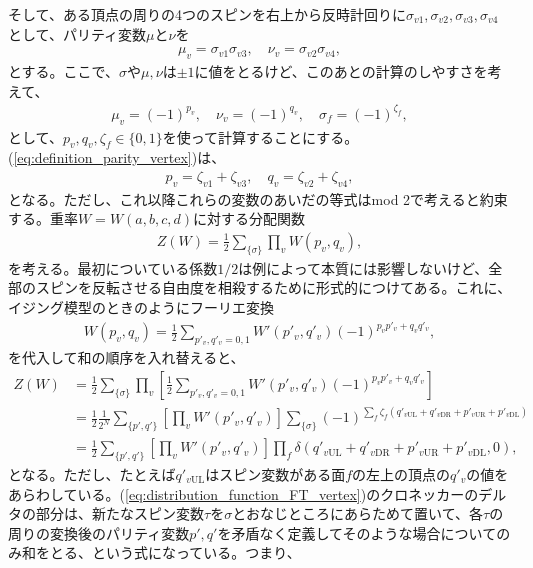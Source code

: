 \documentclass[paper=b5j,fontsize=12Q,jafontsize=12Q,baselineskip=21Q]{jlreq}
\begin{document}
\begin{refsection}
そして、ある頂点の周りの4つのスピンを右上から反時計回りに$\sigma_{v1},\sigma_{v2},\sigma_{v3},\sigma_{v4}$として、パリティ変数$\mu$と$\nu$を
\begin{align}
  \mu_v=\sigma_{v1}\sigma_{v3},\quad\nu_v=\sigma_{v2}\sigma_{v4},\label{eq:definition_parity_vertex}
\end{align}
とする。ここで、$\sigma$や$\mu,\nu$は$\pm1$に値をとるけど、このあとの計算のしやすさを考えて、
\begin{align}
  \mu_v=(-1)^{p_v},\quad \nu_v=(-1)^{q_v},\quad \sigma_f=(-1)^{\zeta_f},
\end{align}
として、$p_v,q_v,\zeta_f\in\{0,1\}$を使って計算することにする。(\ref{eq:definition_parity_vertex})は、
\begin{align}
  p_v=\zeta_{v1}+\zeta_{v3},\quad q_v=\zeta_{v2}+\zeta_{v4},
\end{align}
となる。ただし、これ以降これらの変数のあいだの等式はmod 2で考えると約束する。重率$W=W(a,b,c,d)$に対する分配関数
\begin{align}
  Z(W)=\frac12\sum_{\{\sigma\}}\prod_vW(p_v,q_v),\label{eq:distribution_function_vertex}
\end{align}
を考える。最初についている係数$1/2$は例によって本質には影響しないけど、全部のスピンを反転させる自由度を相殺するために形式的につけてある。これに、イジング模型のときのようにフーリエ変換
\begin{align}
  W(p_v,q_v)=\frac12\sum_{p'_v,q'_v=0,1}W'(p'_v,q'_v)(-1)^{p_vp'_v+q_vq'_v},\label{eq:FT_vertex}
\end{align}
を代入して和の順序を入れ替えると、
\begin{align}
  Z(W)&=\frac12\sum_{\{\sigma\}}\prod_v\left[\frac12\sum_{p'_v,q'_v=0,1}W'(p'_v,q'_v)(-1)^{p_vp'_v+q_vq'_v}\right]\\
  &=\frac12\frac1{2^N}\sum_{\{p',q'\}}\left[\prod_vW'(p'_v,q'_v)\right]\sum_{\{\sigma\}}(-1)^{\sum_f\zeta_f(q'_{v\mathrm{UL}}+q'_{v\mathrm{DR}}+p'_{v\mathrm{UR}}+p'_{v\mathrm{DL}})}\\
  &=\frac12\sum_{\{p',q'\}}\left[\prod_vW'(p'_v,q'_v)\right]\prod_f\delta(q'_{v\mathrm{UL}}+q'_{v\mathrm{DR}}+p'_{v\mathrm{UR}}+p'_{v\mathrm{DL}},0),\label{eq:distribution_function_FT_vertex}
\end{align}
となる。ただし、たとえば$q'_{v\mathrm{UL}}$はスピン変数がある面$f$の左上の頂点の$q'_v$の値をあらわしている。(\ref{eq:distribution_function_FT_vertex})のクロネッカーのデルタの部分は、新たなスピン変数$\tau$を$\sigma$とおなじところにあらためて置いて、各$\tau$の周りの変換後のパリティ変数$p',q'$を矛盾なく定義してそのような場合についてのみ和をとる、という式になっている。つまり、

\end{refsection}
\end{document}
